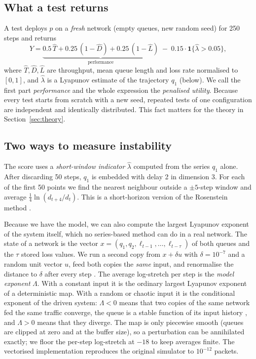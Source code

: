 \subsection{What a test returns}
A test deploys $p$ on a \emph{fresh} network (empty queues, new random seed) for 250 steps and returns
\begin{equation}
Y = \underbrace{0.5\,\hat T + 0.25\,(1-\hat D) + 0.25\,(1-\hat L)}_{\text{performance}} \;-\; 0.15\cdot\mathbf 1\{\hat\lambda > 0.05\},
\label{eq:utility}
\end{equation}
where $\hat T,\hat D,\hat L$ are throughput, mean queue length and loss rate normalised to $[0,1]$, and $\hat\lambda$ is a Lyapunov estimate of the trajectory $q_1$ (below). We call the first part \emph{performance} and the whole expression the \emph{penalised utility}. Because every test starts from scratch with a new seed, repeated tests of one configuration are independent and identically distributed. This fact matters for the theory in Section~\ref{sec:theory}.

\subsection{Two ways to measure instability}
The score uses a \emph{short-window indicator} $\hat\lambda$ computed from the series $q_1$ alone. After discarding 50 steps, $q_1$ is embedded with delay 2 in dimension 3. For each of the first 50 points we find the nearest neighbour outside a $\pm5$-step window and average $\tfrac14\ln(d_{t+4}/d_t)$. This is a short-horizon version of the Rosenstein method \citep{rosenstein1993practical}.

Because we have the model, we can also compute the largest Lyapunov exponent of the system itself, which no series-based method can do in a real network. The state of a network is the vector $x=(q_1,q_2,\ell_{t-1},\dots,\ell_{t-\tau})$ of both queues and the $\tau$ stored loss values. We run a second copy from $x+\delta u$ with $\delta=10^{-7}$ and a random unit vector $u$, feed both copies the \emph{same} input, and renormalise the distance to $\delta$ after every step \citep{benettin1980lyapunov}. The average log-stretch per step is the \emph{model exponent} $\Lambda$. With a constant input it is the ordinary largest Lyapunov exponent of a deterministic map. With a random or chaotic input it is the conditional exponent of the driven system: $\Lambda<0$ means that two copies of the same network fed the same traffic converge, the queue is a stable function of its input history \citep{pecora1990synchronization,rulkov1995generalized}, and $\Lambda>0$ means that they diverge. The map is only piecewise smooth (queues are clipped at zero and at the buffer size), so a perturbation can be annihilated exactly; we floor the per-step log-stretch at $-18$ to keep averages finite. The vectorised implementation reproduces the original simulator to $10^{-12}$ packets.

